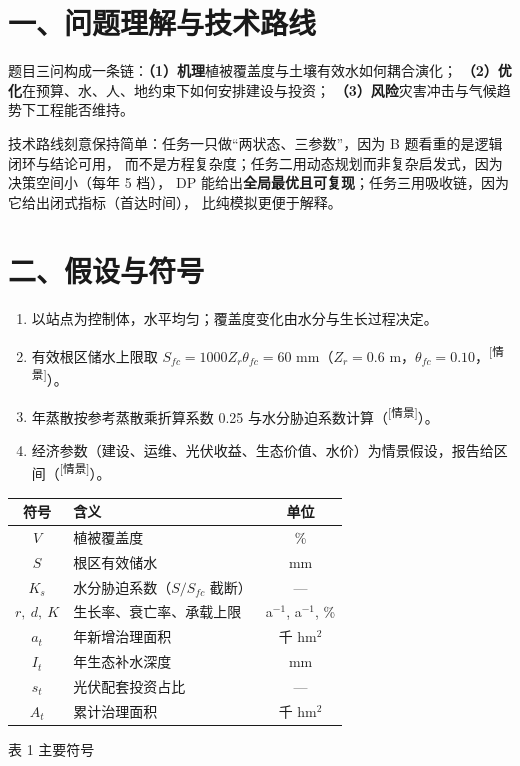 \documentclass[11pt,a4paper]{ctexart}
\newcommand{\src}[1]{\textsuperscript{\scriptsize[#1]}}
\begin{document}
\section*{一、问题理解与技术路线}
题目三问构成一条链：\textbf{（1）机理}植被覆盖度与土壤有效水如何耦合演化；
\textbf{（2）优化}在预算、水、人、地约束下如何安排建设与投资；
\textbf{（3）风险}灾害冲击与气候趋势下工程能否维持。

技术路线刻意保持简单：任务一只做“两状态、三参数”，因为 B 题看重的是逻辑闭环与结论可用，
而不是方程复杂度；任务二用动态规划而非复杂启发式，因为决策空间小（每年 5 档），
DP 能给出\textbf{全局最优且可复现}；任务三用吸收链，因为它给出闭式指标（首达时间），
比纯模拟更便于解释。

\section*{二、假设与符号}
\begin{enumerate}
\item 以站点为控制体，水平均匀；覆盖度变化由水分与生长过程决定。
\item 有效根区储水上限取 $S_{fc}=1000Z_r\theta_{fc}=60$ mm（$Z_r=0.6$ m，$\theta_{fc}=0.10$，\src{情景}）。
\item 年蒸散按参考蒸散乘折算系数 0.25 与水分胁迫系数计算（\src{情景}）。
\item 经济参数（建设、运维、光伏收益、生态价值、水价）为情景假设，报告给区间（\src{情景}）。
\end{enumerate}

\begin{table}[H]\centering\small
\begin{tabularx}{\textwidth}{|c|X|c|}
\toprule
符号 & 含义 & 单位 \\
\midrule
$V$ & 植被覆盖度 & \% \\
$S$ & 根区有效储水 & mm \\
$K_s$ & 水分胁迫系数（$S/S_{fc}$ 截断） & — \\
$r,\ d,\ K$ & 生长率、衰亡率、承载上限 & a$^{-1}$, a$^{-1}$, \% \\
$a_t$ & 年新增治理面积 & 千 hm$^2$ \\
$I_t$ & 年生态补水深度 & mm \\
$s_t$ & 光伏配套投资占比 & — \\
$A_t$ & 累计治理面积 & 千 hm$^2$ \\
\bottomrule
\end{tabularx}
\begin{center}\small 表 1  主要符号\end{center}
\end{table}
\end{document}
